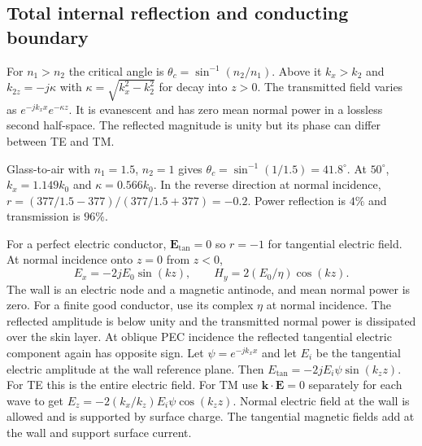 \documentclass[12pt,a4paper]{article}
\begin{document}
\subsection{Total internal reflection and conducting boundary}
For $n_1>n_2$ the critical angle is $\theta_c=\sin^{-1}(n_2/n_1)$. Above it $k_x>k_2$ and $k_{2z}=-j\kappa$ with $\kappa=\sqrt{k_x^2-k_2^2}$ for decay into $z>0$. The transmitted field varies as $e^{-jk_x x}e^{-\kappa z}$. It is evanescent and has zero mean normal power in a lossless second half-space. The reflected magnitude is unity but its phase can differ between TE and TM.
\begin{tcolorbox}[examplebox,title={Glass to air and air to glass}]
Glass-to-air with $n_1=1.5$, $n_2=1$ gives $\theta_c=\sin^{-1}(1/1.5)=41.8^\circ$. At $50^\circ$, $k_x=1.149k_0$ and $\kappa=0.566k_0$. In the reverse direction at normal incidence, $r=(377/1.5-377)/(377/1.5+377)=-0.2$. Power reflection is $4\%$ and transmission is $96\%$.
\end{tcolorbox}

For a perfect electric conductor, $\mathbf E_{\tan}=0$ so $r=-1$ for tangential electric field. At normal incidence onto $z=0$ from $z<0$,
\[
 E_x=-2jE_0\sin(kz),\qquad H_y=2(E_0/\eta)\cos(kz).
\]
The wall is an electric node and a magnetic antinode, and mean normal power is zero. For a finite good conductor, use its complex $\eta$ at normal incidence. The reflected amplitude is below unity and the transmitted normal power is dissipated over the skin layer.
At oblique PEC incidence the reflected tangential electric component again has opposite sign. Let $\psi=e^{-jk_x x}$ and let $E_i$ be the tangential electric amplitude at the wall reference plane. Then $E_{\tan}=-2j E_i\psi\sin(k_z z)$. For TE this is the entire electric field. For TM use $\mathbf k\cdot\mathbf E=0$ separately for each wave to get $E_z=-2(k_x/k_z) E_i\psi\cos(k_z z)$. Normal electric field at the wall is allowed and is supported by surface charge. The tangential magnetic fields add at the wall and support surface current.
\end{document}
